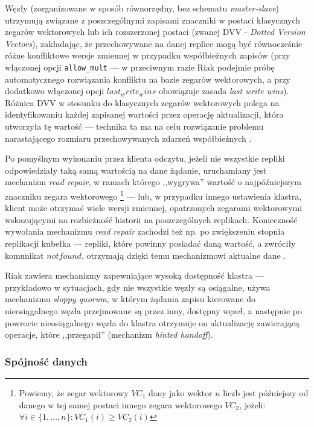 Węzły (zorganizowane w sposób równorzędny, bez schematu \textit{master-slave}) utrzymują związane z poszczególnymi zapisami znaczniki w postaci klasycznych zegarów wektorowych lub ich rozszerzonej postaci (zwanej DVV - \textit{Dotted Version Vectors}), zakładając, że przechowywane na danej replice mogą być równocześnie różne konfliktowe wersje zmiennej w przypadku współbieżnych zapisów (przy włączonej opcji \texttt{allow\_mult} --- w przeciwnym razie Riak podejmie próbę automatycznego rozwiązania konfliktu na bazie zegarów wektorowych, a przy dodatkowo włączonej opcji $last_write_wins$ obowiązuje zasada \textit{last write wins}). Różnica DVV w stosunku do klasycznych zegarów wektorowych polega na identyfikowaniu każdej zapisanej wartości przez operację aktualizacji, która utworzyła tę wartość --- technika ta ma na celu rozwiązanie problemu narastającego rozmiaru przechowywanych zdarzeń współbieżnych \cite{riakdvv}.

Po pomyślnym wykonaniu przez klienta odczytu, jeżeli nie wszystkie repliki odpowiedziały taką samą wartością na dane żądanie, uruchamiany jest mechanizm \textit{read repair}, w ramach którego ,,wygrywa'' wartość o najpóźniejszym znaczniku zegara wektorowego \footnote{Powiemy, że zegar wektorowy $VC_1$ dany jako wektor $n$ liczb jest późniejszy od danego w tej samej postaci innego zegara wektorowego $VC_2$, jeżeli: $\forall i\in\{1,\dots,n\} : VC_1(i)\geq VC_2(i)$} --- lub, w przypadku innego ustawienia klastra, klient może otrzymać wiele wersji zmiennej, opatrzonych zegarami wektorowymi wskazującymi na rozbieżność historii na poszczególnych replikach. Konieczność wywołania mechanizmu \textit{read repair} zachodzi też np. po zwiększeniu stopnia replikacji kubełka --- repliki, które powinny posiadać daną wartość, a zwróciły komunikat $not found$, otrzymają dzięki temu mechanizmowi aktualne dane \cite{riakrepl}.

Riak zawiera mechanizmy zapewniające wysoką dostępność klastra --- przykładowo w sytuacjach, gdy nie wszystkie węzły są osiągalne, używa mechanizmu \textit{sloppy quorum}, w którym żądania zapisu kierowane do nieosiągalnego węzła przejmowane są przez inny, dostępny węzeł, a następnie po powrocie nieosiągalnego węzła do klastra otrzymuje on aktualizację zawierającą operacje, które ,,przegapił'' (mechanizm \textit{hinted handoff}). \cite{riakgloss}

\subsubsection*{Spójność danych}

